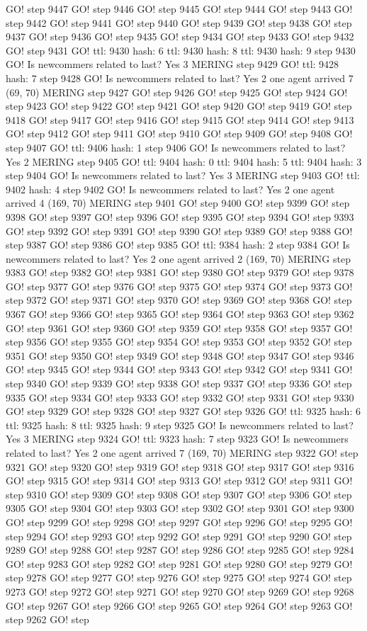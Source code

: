 GO! step 9447 GO! step 9446 GO! step 9445 GO! step 9444 GO! step 9443 GO! step 9442 GO! step 9441 GO! step 9440 GO! step 9439 GO! step 9438 GO! step 9437 GO! step 9436 GO! step 9435 GO! step 9434 GO! step 9433 GO! step 9432 GO! step 9431 GO! ttl: 9430 hash: 6 ttl: 9430 hash: 8 ttl: 9430 hash: 9 step 9430 GO! Is newcommers related to last? Yes 3 MERING step 9429 GO! ttl: 9428 hash: 7 step 9428 GO! Is newcommers related to last? Yes 2 one agent arrived 7 (69, 70) MERING step 9427 GO! step 9426 GO! step 9425 GO! step 9424 GO! step 9423 GO! step 9422 GO! step 9421 GO! step 9420 GO! step 9419 GO! step 9418 GO! step 9417 GO! step 9416 GO! step 9415 GO! step 9414 GO! step 9413 GO! step 9412 GO! step 9411 GO! step 9410 GO! step 9409 GO! step 9408 GO! step 9407 GO! ttl: 9406 hash: 1 step 9406 GO! Is newcommers related to last? Yes 2 MERING step 9405 GO! ttl: 9404 hash: 0 ttl: 9404 hash: 5 ttl: 9404 hash: 3 step 9404 GO! Is newcommers related to last? Yes 3 MERING step 9403 GO! ttl: 9402 hash: 4 step 9402 GO! Is newcommers related to last? Yes 2 one agent arrived 4 (169, 70) MERING step 9401 GO! step 9400 GO! step 9399 GO! step 9398 GO! step 9397 GO! step 9396 GO! step 9395 GO! step 9394 GO! step 9393 GO! step 9392 GO! step 9391 GO! step 9390 GO! step 9389 GO! step 9388 GO! step 9387 GO! step 9386 GO! step 9385 GO! ttl: 9384 hash: 2 step 9384 GO! Is newcommers related to last? Yes 2 one agent arrived 2 (169, 70) MERING step 9383 GO! step 9382 GO! step 9381 GO! step 9380 GO! step 9379 GO! step 9378 GO! step 9377 GO! step 9376 GO! step 9375 GO! step 9374 GO! step 9373 GO! step 9372 GO! step 9371 GO! step 9370 GO! step 9369 GO! step 9368 GO! step 9367 GO! step 9366 GO! step 9365 GO! step 9364 GO! step 9363 GO! step 9362 GO! step 9361 GO! step 9360 GO! step 9359 GO! step 9358 GO! step 9357 GO! step 9356 GO! step 9355 GO! step 9354 GO! step 9353 GO! step 9352 GO! step 9351 GO! step 9350 GO! step 9349 GO! step 9348 GO! step 9347 GO! step 9346 GO! step 9345 GO! step 9344 GO! step 9343 GO! step 9342 GO! step 9341 GO! step 9340 GO! step 9339 GO! step 9338 GO! step 9337 GO! step 9336 GO! step 9335 GO! step 9334 GO! step 9333 GO! step 9332 GO! step 9331 GO! step 9330 GO! step 9329 GO! step 9328 GO! step 9327 GO! step 9326 GO! ttl: 9325 hash: 6 ttl: 9325 hash: 8 ttl: 9325 hash: 9 step 9325 GO! Is newcommers related to last? Yes 3 MERING step 9324 GO! ttl: 9323 hash: 7 step 9323 GO! Is newcommers related to last? Yes 2 one agent arrived 7 (169, 70) MERING step 9322 GO! step 9321 GO! step 9320 GO! step 9319 GO! step 9318 GO! step 9317 GO! step 9316 GO! step 9315 GO! step 9314 GO! step 9313 GO! step 9312 GO! step 9311 GO! step 9310 GO! step 9309 GO! step 9308 GO! step 9307 GO! step 9306 GO! step 9305 GO! step 9304 GO! step 9303 GO! step 9302 GO! step 9301 GO! step 9300 GO! step 9299 GO! step 9298 GO! step 9297 GO! step 9296 GO! step 9295 GO! step 9294 GO! step 9293 GO! step 9292 GO! step 9291 GO! step 9290 GO! step 9289 GO! step 9288 GO! step 9287 GO! step 9286 GO! step 9285 GO! step 9284 GO! step 9283 GO! step 9282 GO! step 9281 GO! step 9280 GO! step 9279 GO! step 9278 GO! step 9277 GO! step 9276 GO! step 9275 GO! step 9274 GO! step 9273 GO! step 9272 GO! step 9271 GO! step 9270 GO! step 9269 GO! step 9268 GO! step 9267 GO! step 9266 GO! step 9265 GO! step 9264 GO! step 9263 GO! step 9262 GO! step 